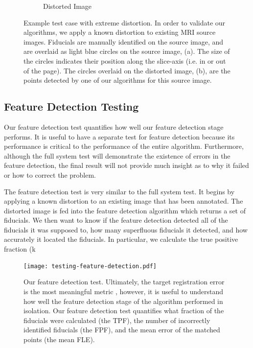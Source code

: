 \documentclass[12pt]{article}
\begin{document}
\begin{figure}
\begin{subfigure}[b]{0.48\textwidth}
        \caption{Distorted Image}
        \label{fig:test-case_2}
    \end{subfigure}
    \caption{Example test case with extreme distortion.  In order to validate our algorithms, we apply a known distortion to existing MRI source images.  Fiducials are manually identified on the source image, and are overlaid as light blue circles on the source image, (a).  The size of the circles indicates their position along the slice-axis (i.e. in or out of the page).  The circles overlaid on the distorted image, (b), are the points detected by one of our algorithms for this source image.}
    \label{fig:test-case}
\end{figure}

\subsection{Feature Detection Testing}

Our feature detection test quantifies how well our feature detection stage performs.  It is useful to have a separate test for feature detection because its performance is critical to the performance of the entire algorithm.  Furthermore, although the full system test will demonstrate the existence of errors in the feature detection, the final result will not provide much insight as to why it failed or how to correct the problem.

The feature detection test is very similar to the full system test.  It begins by applying a known distortion to an existing image that has been annotated.  The distorted image is fed into the feature detection algorithm which returns a set of fiducials.  We then want to know if the feature detection detected all of the fiducials it was supposed to, how many superfluous fiducials it detected, and how accurately it located the fiducials.  In particular, we calculate the true positive fraction (k

\begin{figure}
    \centering
    \texttt{[image: testing-feature-detection.pdf]}
    \caption{Our feature detection test.  Ultimately, the target registration error is the most meaningful metric \cite[page R38]{hill2001}, however, it is useful to understand how well the feature detection stage of the algorithm performed in isolation.  Our feature detection test quantifies what fraction of the fiducials were calculated (the TPF), the number of incorrectly identified fiducials (the FPF), and the mean error of the matched points (the mean FLE).}
    \label{fig:testing-feature-detection}
\end{figure}
\end{document}
